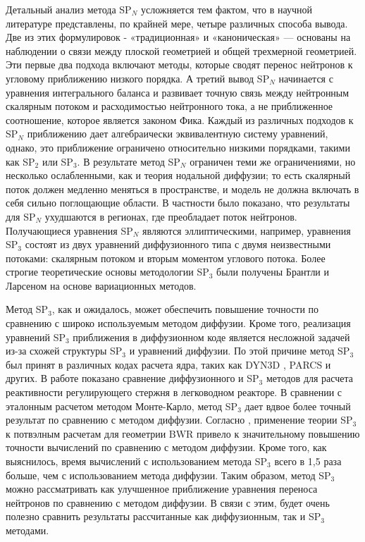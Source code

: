 \documentclass{crm-article}
\begin{document}
Детальный анализ метода SP$_N$ усложняется тем фактом, что в научной литературе представлены, по крайней мере, четыре различных способа вывода.
Две из этих формулировок - «традиционная» и «каноническая» --- основаны на наблюдении о связи между плоской геометрией и общей трехмерной геометрией.
Эти первые два подхода включают методы, которые сводят перенос нейтронов к угловому приближению низкого порядка.
А третий вывод SP$_N$ начинается с уравнения интегрального баланса и развивает точную связь между нейтронным скалярным потоком и расходимостью нейтронного тока, а не приближенное соотношение, которое является законом Фика.
Каждый из различных подходов к SP$_N$ приближению дает алгебраически эквивалентную систему уравнений, однако, это приближение ограничено относительно низкими порядками, такими как SP$_2$ или SP$_3$.
В результате метод SP$_N$ ограничен теми же ограничениями, но несколько ослабленными, как и теория нодальной диффузии; то есть скалярный поток должен медленно меняться в пространстве, и модель не должна включать в себя сильно поглощающие области. 
В частности было показано, что результаты для SP$_N$ ухудшаются в регионах, где преобладает поток нейтронов.
Получающиеся уравнения SP$_N$ являются эллиптическими, например, уравнения SP$_3$ состоят из двух уравнений диффузионного типа с двумя неизвестными потоками: скалярным потоком и вторым моментом углового потока.
Более строгие теоретические основы методологии SP$_3$ были получены Брантли и Ларсеном \cite{brantley2000} на основе вариационных методов.

Метод SP$_3$, как и ожидалось, может обеспечить повышение точности по сравнению с широко используемым методом диффузии.
Кроме того, реализация уравнений SP$_3$ приближения в диффузионном коде является несложной задачей из-за схожей структуры SP$_3$ и уравнений диффузии.
По этой причине метод SP$_3$ был принят в различных кодах расчета ядра, таких как DYN3D \cite{beckert2008}, PARCS \cite{downar2009} и других. 
В работе \cite{brewster2018} показано сравнение диффузионного и SP$_3$ методов для расчета реактивности регулирующего стержня в легководном реакторе.
В сравнении с эталонным расчетом методом Монте-Карло, метод SP$_3$ дает вдвое более точный результат по сравнению с методом диффузии. 
Согласно \cite{tada2008}, применение теории SP$_3$ к потвэлным расчетам для геометрии BWR привело к значительному повышению точности вычислений по сравнению с методом диффузии.
Кроме того, как выяснилось, время вычислений с использованием метода SP$_3$ всего в 1,5 раза больше, чем с использованием метода диффузии.
Таким образом, метод SP$_3$ можно рассматривать как улучшенное приближение уравнения переноса нейтронов по сравнению с методом диффузии.
В связи с этим, будет очень полезно сравнить результаты рассчитанные как диффузионным, так и SP$_3$ методами.
\end{document}
